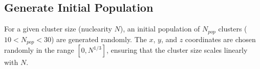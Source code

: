 \subsection{Generate Initial Population}

For a given cluster size (nuclearity $N$), an initial population of $N_{pop}$ clusters ($10<N_{pop}<30$) are generated
randomly. The $x$, $y$, and $z$ coordinates are chosen randomly in the range $[0,N^{1/3}]$, ensuring that the cluster
size scales linearly with $N$.


